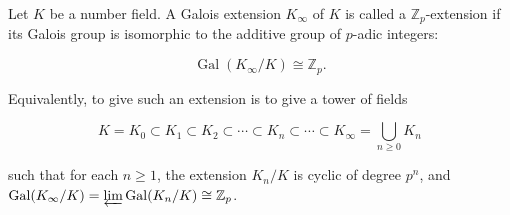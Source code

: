 Let $K$ be a number field. A Galois extension $K_\infty$ of $K$ is called a $\mathbb{Z}_p$-extension if its Galois group is isomorphic to the additive group of $p$-adic integers:

$$
\operatorname{Gal}(K_\infty / K) \cong \mathbb{Z}_p.
$$

Equivalently, to give such an extension is to give a tower of fields

$$
K = K_0 \subset K_1 \subset K_2 \subset \cdots \subset K_n \subset \cdots \subset K_\infty = \bigcup_{n \geq 0} K_n
$$

such that for each $n \geq 1$, the extension $K_n / K$ is cyclic of degree $p^n$, and $\operatorname{Gal}(K_\infty/K) = \varprojlim \operatorname{Gal}(K_n/K) \cong \mathbb{Z}_p$.
